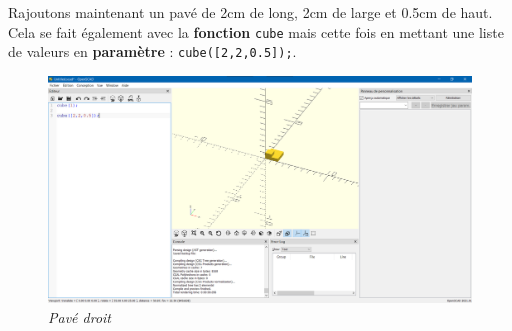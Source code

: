 Rajoutons maintenant un pavé de 2cm de long, 2cm de large et 0.5cm de haut.
Cela se fait également avec la \textbf{fonction} \verb|cube| mais cette fois en mettant une liste de valeurs en \textbf{paramètre} : \verb|cube([2,2,0.5]);|.

\begin{figure}[ht]
	\centering
	\includegraphics[width=12cm]{images/cube_2-2-05}
	\caption{\textit{Pavé droit}}
\end{figure}